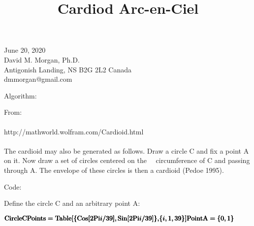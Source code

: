 \documentclass{article}
\begin{document}
\title{Cardiod Arc-en-Ciel}
\author{}
\date{}
\maketitle

June 20, 2020\\
David M. Morgan, Ph.D.\\
Antigonish Landing, NS B2G 2L2 Canada\\
dmmorgan@gmail.com

Algorithm: 

From:\\
\\
http://mathworld.wolfram.com/Cardioid.html\\
\\
The cardioid may also be generated as follows. Draw a circle C and fix a point A on it. Now draw a set of circles centered on the $\quad $circumference of C and passing through A. The envelope of these circles is then a cardioid (Pedoe 1995). 

Code:

Define the circle C and an arbitrary point A:

\begin{doublespace}
\noindent\(\pmb{\text{CircleCPoints} = \text{Table}[}\\
\pmb{\{\text{Cos}[2 \text{Pi} i / 39], \text{Sin}[2 \text{Pi} i / 39]\},}\\
\pmb{\{i, 1, 39\}}\\
\pmb{]}\\
\pmb{}\\
\pmb{\text{PointA} = \{0,1\}}\)
\end{doublespace}
\end{document}

